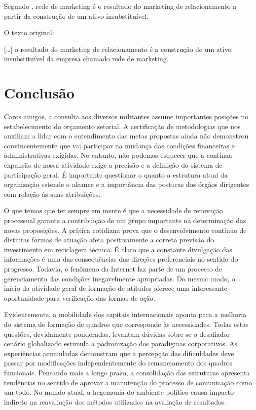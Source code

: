 \documentclass[
	12pt,				%
	oneside,			%
	a4paper,			%
	english,			%
	french,				%
	spanish,			%
	brazil				%
	]{abntex2}
\renewenvironment{quote}
  {\small\list{}{\rightmargin=0.1cm \leftmargin=4cm}%
   \item\relax}
  {\endlist}
\begin{document}
Segundo , rede de marketing é o resultado do
marketing de relacionamento a partir da construção de um ativo
insubstituível.

O texto original:

\begin{quote}
{[}\ldots{}{]} o resultado do marketing de relacionamento é a construção
de um ativo insubstituível da empresa chamado rede de marketing.
\end{quote}

\hypertarget{conclusuxe3o}{%
\chapter{Conclusão}\label{conclusuxe3o}}

Caros amigos, a consulta aos diversos militantes assume importantes
posições no estabelecimento do orçamento setorial. A certificação de
metodologias que nos auxiliam a lidar com o entendimento das metas
propostas ainda não demonstrou convincentemente que vai participar na
mudança das condições financeiras e administrativas exigidas. No
entanto, não podemos esquecer que a contínua expansão de nossa atividade
exige a precisão e a definição do sistema de participação geral. É
importante questionar o quanto a estrutura atual da organização estende
o alcance e a importância das posturas dos órgãos dirigentes com relação
às suas atribuições.

O que temos que ter sempre em mente é que a necessidade de renovação
processual garante a contribuição de um grupo importante na determinação
das novas proposições. A prática cotidiana prova que o desenvolvimento
contínuo de distintas formas de atuação afeta positivamente a correta
previsão do investimento em reciclagem técnica. É claro que a constante
divulgação das informações é uma das consequências das direções
preferenciais no sentido do progresso. Todavia, o fenômeno da Internet
faz parte de um processo de gerenciamento das condições inegavelmente
apropriadas. Do mesmo modo, o início da atividade geral de formação de
atitudes oferece uma interessante oportunidade para verificação das
formas de ação.

Evidentemente, a mobilidade dos capitais internacionais aponta para a
melhoria do sistema de formação de quadros que corresponde às
necessidades. Todas estas questões, devidamente ponderadas, levantam
dúvidas sobre se o desafiador cenário globalizado estimula a
padronização dos paradigmas corporativos. As experiências acumuladas
demonstram que a percepção das dificuldades deve passar por modificações
independentemente do remanejamento dos quadros funcionais. Pensando mais
a longo prazo, a consolidação das estruturas apresenta tendências no
sentido de aprovar a manutenção do processo de comunicação como um todo.
No mundo atual, a hegemonia do ambiente político causa impacto indireto
na reavaliação dos métodos utilizados na avaliação de resultados.
\end{document}
